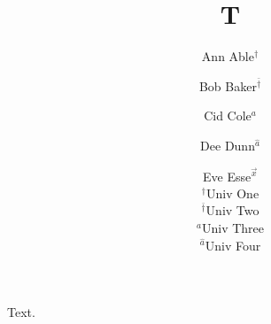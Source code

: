 \documentclass{article}
\title{T}
\author{Ann Able$^{\dag}$ \and Bob Baker$^{\bar{\dag}}$ \and Cid Cole$^{a}$ \and Dee Dunn$^{\hat a}$
  \and Eve Esse$^{\vec x}$\\ $^{\dag}$Univ One\\ $^{\bar{\dag}}$Univ Two\\ $^{a}$Univ Three\\ $^{\hat a}$Univ Four}
\begin{document}
\maketitle
Text.
\end{document}
